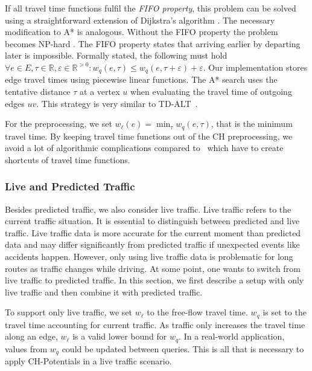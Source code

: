 \documentclass[manuscript,review]{acmart}
\begin{document}
If all travel time functions fulfil the \emph{FIFO property}, this problem can be solved using a straightforward extension of Dijkstra's algorithm \cite{d-aassp-69}.
The necessary modification to A* is analogous.
Without the FIFO property the problem becomes NP-hard \cite{or-tnp-89,z-nphsp-22}.
The FIFO property states that arriving earlier by departing later is impossible.
Formally stated, the following must hold $\forall e\in E,\tau\in \mathbb{R},\varepsilon\in \mathbb{R}^{>0}: w_q(e, \tau) \le w_q(e, \tau+\varepsilon) + \varepsilon$.
Our implementation stores edge travel times using piecewise linear functions.
The A* search uses the tentative distance $\tau$ at a vertex $u$ when evaluating the travel time of outgoing edges $u v$.
This strategy is very similar to TD-ALT~\cite{ndls-bastd-12,dw-lbrdg-07}.

For the preprocessing, we set $w_\ell(e) = \min_\tau w_q(e,\tau)$, that is the minimum travel time.
By keeping travel time functions out of the CH preprocessing, we avoid a lot of algorithmic complications compared to~\cite{bgsv-mtdtt-13,bdpw-dtdrp-16,swz-sfert-21,dn-crdtd-12} which have to create shortcuts of travel time functions.

\subsubsection{Live and Predicted Traffic}
\label{sec:live-predicted-traffic}

Besides predicted traffic, we also consider live traffic.
Live traffic refers to the current traffic situation.
It is essential to distinguish between predicted and live traffic.
Live traffic data is more accurate for the current moment than predicted data and may differ significantly from predicted traffic if unexpected events like accidents happen.
However, only using live traffic data is problematic for long routes as traffic changes while driving.
At some point, one wants to switch from live traffic to predicted traffic.
In this section, we first describe a setup with only live traffic and then combine it with predicted traffic.

To support only live traffic, we set $w_\ell$ to the free-flow travel time.
$w_q$ is set to the travel time accounting for current traffic.
As traffic only increases the travel time along an edge, $w_\ell$ is a valid lower bound for $w_q$.
In a real-world application, values from $w_q$ could be updated between queries.
This is all that is necessary to apply CH-Potentials in a live traffic scenario.
\end{document}
